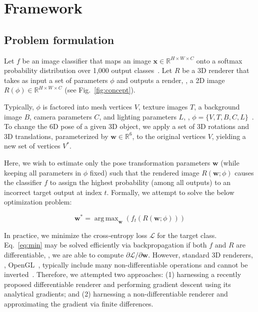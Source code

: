 \documentclass[10pt,twocolumn,letterpaper]{article}
\DeclareMathOperator*{\argmax}{arg\,max}
\newcommand{\x}{\mathbf{x}}
\newcommand{\w}{\mathbf{w}}
\newcommand{\LL}{\mathcal{L}}
\newcommand{\R}{\mathbb{R}}
\begin{document}
\section{Framework}

\subsection{Problem formulation}

Let $f$ be an image classifier  that maps an image $\x \in \R^{H\times W\times C}$ onto a softmax probability distribution over 1,000 output classes~\cite{szegedy2016rethinking}.
%
%
Let $R$ be a 3D renderer that takes as input a set of parameters $\phi$ and outputs a render, \ie, a 2D image $R(\phi) \in \R^{H\times W\times C}$ (see Fig.~\ref{fig:concept}).

Typically, $\phi$ is factored into mesh vertices $V$, texture images $T$, a background image $B$, camera parameters $C$, and lighting parameters $L$, \ie, $\phi = \{V, T, B, C, L\}$~\cite{kato2018neural}.
To change the 6D pose of a given 3D object, we apply a set of 3D rotations and 3D translations, parameterized by $\w \in \R^6$, to the original vertices $V$, yielding a new set of vertices $V^*$.

Here, we wish to estimate only the pose transformation parameters $\w$ (while keeping all parameters in $\phi$ fixed) such that the rendered image $R(\w;\phi)$ causes the classifier $f$ to assign the highest probability (among all outputs) to an incorrect target output at index $t$.
Formally, we attempt to solve the below optimization problem:

\begin{equation}
\label{eq:min}
\w^* = \argmax_{\w}(f_t(R(\w; \phi)))
\end{equation}

In practice, we minimize the cross-entropy loss $\LL$ for the target class.
Eq.~\ref{eq:min} may be solved efficiently via backpropagation if both $f$ and $R$ are differentiable, \ie, we are able to compute $\partial \LL/\partial\w$.
However, standard 3D renderers, \eg, OpenGL~\cite{woo1999opengl}, typically include many non-differentiable operations and cannot be inverted~\cite{marschner2015fundamentals}.
Therefore, we attempted two approaches: (1) harnessing a recently proposed differentiable renderer and performing gradient descent using its analytical gradients; and (2) harnessing a non-differentiable renderer and approximating the gradient via finite differences.
\end{document}
